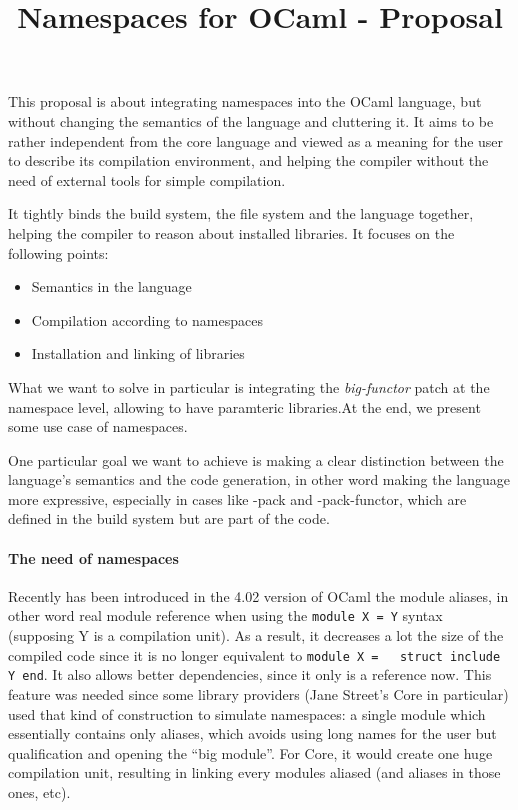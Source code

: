 \documentclass[11pt,a4paper]{article}
\title{Namespaces for OCaml - Proposal}
\begin{document}
\maketitle

This proposal is about integrating namespaces into the OCaml language, but
without changing the semantics of the language and cluttering it. It aims to be
rather independent from the core language and viewed as a meaning for the user to
describe its compilation environment, and helping the compiler without the need
of external tools for simple compilation.

It tightly binds the build system, the file system and the language together,
helping the compiler to reason about installed libraries.
It focuses on the following points:
\begin{itemize}
\item Semantics in the language
\item Compilation according to namespaces
\item Installation and linking of libraries
\end{itemize}

What we want to solve in particular is integrating the \emph{big-functor} patch
at the namespace level, allowing to have paramteric libraries.At the end, we
present some use case of namespaces.

One particular goal we want to achieve is making a clear distinction between the
language's semantics and the code generation, in other word making the language
more expressive, especially in cases like -pack and -pack-functor, which are
defined in the build system but are part of the code.


\paragraph{The need of namespaces}

Recently has been introduced in the 4.02 version of OCaml the module aliases, in
other word real module reference when using the \lstinline{module X = Y} syntax
(supposing Y is a compilation unit). As a result, it decreases a lot the size of
the compiled code since it is no longer equivalent to \lstinline{module X =
  struct include Y end}. It also allows better dependencies, since it only is a
reference now. This feature was needed since some library providers (Jane
Street's Core in particular) used that kind of construction to simulate
namespaces: a single module which essentially contains only aliases, which
avoids using long names for the user but qualification and opening the ``big
module''. For Core, it would create one huge compilation unit, resulting in
linking every modules aliased (and aliases in those ones, etc).
\end{document}
